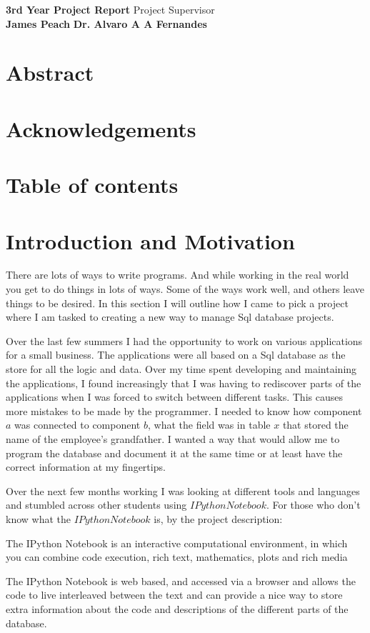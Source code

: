 \documentclass[a4paper, 11pt]{article}
\begin{document}
\noindent\large\textbf{3rd Year Project Report} \hfill \normalsize Project Supervisor  \\
\textbf{James Peach}  \hfill
\textbf{Dr. Alvaro A A Fernandes}\hfill

\section*{Abstract}

\section*{Acknowledgements}

\section*{Table of contents}

\section{Introduction and Motivation}

There are lots of ways to write programs. And while working in the real world
you get to do things in lots of ways. Some of the ways work well, and others
leave things to be desired. In this section I will outline how I came  to pick a
project where I am tasked to creating a new way to manage Sql database projects.

Over the last few summers I had the opportunity to work on various applications
for a small business. The applications were all based on a Sql database as the
store for all the logic and data. Over my time spent developing and maintaining
the applications, I found increasingly that I was having to rediscover parts of
the applications when I was forced to switch between different tasks. This
causes more mistakes to be made by the programmer. I needed to know how
component $a$ was connected to component $b$, what the field was in table $x$
that stored the name of the employee's grandfather. I wanted a way that would
allow me to program the database and document it at the same time or at least
have the correct information at my fingertips.

Over the next few months working I was looking at different tools and languages
and stumbled across other students using $IPython Notebook$. For those who don't
know what the $IPython Notebook$ is, by the project description:
\begin{displayquote}
The IPython Notebook is an interactive computational environment, in which
 you can combine code execution, rich text, mathematics, plots and rich media
 \cite{IPython Notebook}
\end{displayquote}
The IPython Notebook is web based, and accessed via a browser and allows the
code to live interleaved between the text and can provide a nice way to store
extra information about the code and descriptions of the different parts of the
database.
\end{document}
